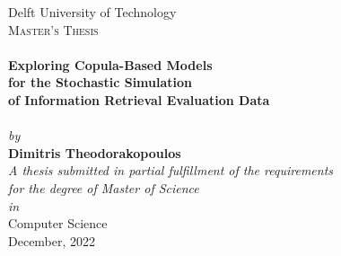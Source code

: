 \begin{titlepage}
\begin{center}
	\vspace*{.06\textheight}
	
	{\LARGE Delft University of Technology\\[1.5cm]} %
	\textsc{\Large Master's Thesis}\\[0.5cm] %
	
	\HRule \\[0.4cm] %
	{\bfseries \huge \color{tudelft-cyan}Exploring Copula-Based Models \\ for the Stochastic Simulation \\ of Information Retrieval Evaluation Data\\[0.4cm]}
	\HRule \\[0.75cm] %
	
	\normalsize \textit{by}\\[0.4cm]
	{\Large \textbf{Dimitris Theodorakopoulos}}\\[4cm]
	
	\large \textit{A thesis submitted in partial fulfillment of the requirements\\ for the degree of Master of Science}\\[0.3cm]
	\normalsize \textit{in}\\[0.4cm]
	\large Computer Science\\[3cm]
	
	{\large December, 2022}
\end{center}
\end{titlepage}